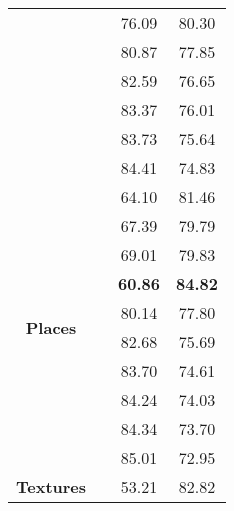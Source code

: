 \documentclass{article}
\begin{document}
\begin{table}[t]
\begin{tabular}{c|c|cc}
                                       &                              & 76.09                & 80.30                \\
                                       &                              & 80.87                & 77.85                \\
                                       &                              & 82.59                & 76.65                \\
                                       &                              & 83.37                & 76.01                \\
                                       &                              & 83.73                & 75.64                \\
                                       &                            & 84.41                & 74.83                \\ \midrule
\multirow{10}{*}{\textbf{Places}}      &                           & 64.10                & 81.46                \\
                                       &                            & 67.39                & 79.79                \\
                                       &                           & 69.01                & 79.83                \\
                                       &                              & \textbf{60.86}       & \textbf{84.82}       \\
                                       &                              & 80.14                & 77.80                \\
                                       &                              & 82.68                & 75.69                \\
                                       &                              & 83.70                & 74.61                \\
                                       &                              & 84.24                & 74.03                \\
                                       &                              & 84.34                & 73.70                \\
                                       &                            & 85.01                & 72.95                \\ \midrule
\multirow{10}{*}{\textbf{Textures}}    &                            & 53.21                & 82.82                \\

\end{tabular}
\end{table}
\end{document}

